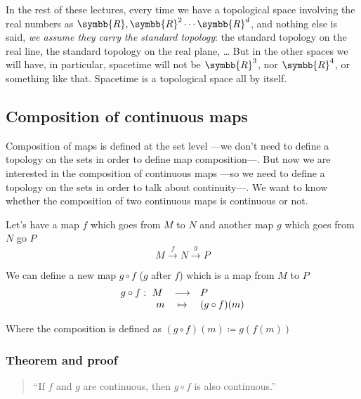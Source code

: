   In the rest of these lectures, every time we have a topological space involving the real
  numbers as $\symbb{R}, \symbb{R}^2 \cdots \symbb{R}^d$, and nothing else is said,
  \emph{we assume they carry the standard topology}: the standard topology on the real line,
  the standard topology on the real plane, \dots
  But in the other spaces we will have, in particular, spacetime will not be $\symbb{R}^3$,
  nor $\symbb{R}^4$, or something like that. Spacetime is a topological space all by itself.

  \subsection{Composition of continuous maps}
  Composition of maps is defined at the set level ---we don't need to define a topology on
  the sets in order to define map composition---.
  But now we are interested in the composition of continuous maps ---so we need to define a
  topology on the sets in order to talk about continuity---. We want to know whether the
  composition of two continuous maps is continuous or not.

  Let's have a map $f$ which goes from $M$ to $N$ and another map $g$ which goes from
  $N$ go $P$
  \[
    M \xrightarrow{\hspace{4pt}f\hspace{4pt}} N \xrightarrow{\hspace{5pt}g\hspace{5pt}} P
  \]

  We can define a new map $g\circ f$ ($g$ after $f$) which is a map from $M$ to $P$
  \[
    \begin{array}{rccl}
      g\circ f:& \hspace{-6pt}M & \longrightarrow & P \\
      &  m & \mapsto & (g\circ f)(m)
    \end{array}
  \]

  Where the composition is defined as $(g\circ f) (m) \coloneq g(f(m))$

  \subsubsection{Theorem and proof}
  \begin{quote}
    ``If $f$ and $g$ are continuous, then $g\circ f$ is also continuous.''
  \end{quote}

